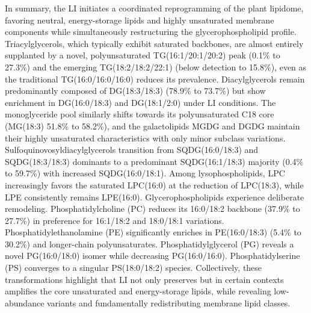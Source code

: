 \documentclass[10pt,letterpaper]{article}
\begin{document}
In summary, the LI initiates a coordinated reprogramming of the plant lipidome, favoring neutral, energy-storage lipids and highly unsaturated membrane components while simultaneously restructuring the glycerophospholipid profile. Triacylglycerols, which typically exhibit saturated backbones, are almost entirely supplanted by a novel, polyunsaturated TG(16:1/20:1/20:2) peak (0.1\% to 27.3\%) and the emerging TG(18:2/18:2/22:1) (below detection to 15.8\%), even as the traditional TG(16:0/16:0/16:0) reduces its prevalence. Diacylglycerols remain predominantly composed of DG(18:3/18:3) (78.9\% to 73.7\%) but show enrichment in DG(16:0/18:3) and DG(18:1/2:0) under LI conditions. The monoglyceride pool similarly shifts towards its polyunsaturated C18 core (MG(18:3) 51.8\% to 58.2\%), and the galactolipids MGDG and DGDG maintain their highly unsaturated characteristics with only minor subclass variations. Sulfoquinovosyldiacylglycerols transition from SQDG(16:0/18:3) and SQDG(18:3/18:3) dominants to a predominant SQDG(16:1/18:3) majority (0.4\% to 59.7\%) with increased SQDG(16:0/18:1). Among lysophospholipids, LPC increasingly favors the saturated LPC(16:0) at the reduction of LPC(18:3), while LPE consistently remains LPE(16:0). Glycerophospholipids experience deliberate remodeling. Phosphatidylcholine (PC) reduces its 16:0/18:2 backbone (37.9\% to 27.7\%) in preference for 16:1/18:2 and 18:0/18:1 variations. Phosphatidylethanolamine (PE) significantly enriches in PE(16:0/18:3) (5.4\% to 30.2\%) and longer-chain polyunsaturates. Phosphatidylglycerol (PG) reveals a novel PG(16:0/18:0) isomer while decreasing PG(16:0/16:0). Phosphatidylserine (PS) converges to a singular PS(18:0/18:2) species. Collectively, these transformations highlight that LI not only preserves but in certain contexts amplifies the core unsaturated and energy-storage lipids, while revealing low-abundance variants and fundamentally redistributing membrane lipid classes.
\end{document}
